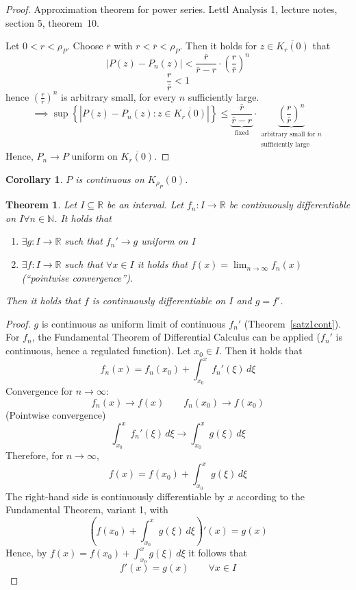 \documentclass{article}
\newtheorem{theorem}{Theorem}  \numberwithin{theorem}{section}
\newtheorem*{corollary}{Corollary}%
\newcommand{\set}[1]{\left\{#1\right\}}
\newcommand{\card}[1]{\left|#1\right|}
\begin{document}
\begin{proof}
  Approximation theorem for power series.
  Lettl Analysis 1, lecture notes, section 5, theorem~10.

  Let $0 < r < \rho_P$. Choose $\overline{r}$ with $r < \overline{r} < \rho_P$.
  Then it holds for $z \in \overline{K_r(0)}$ that
  \[ \card{P(z) - P_n(z)} < \frac{\overline{r}}{\overline{r} - r} \cdot \left(\frac{r}{\overline{r}}\right)^n \]
  \[ \frac{r}{\overline{r}} < 1 \]
  hence $\left(\frac{r}{\overline{r}}\right)^n$ is arbitrary small, for every $n$ sufficiently large.
  \[ \implies \sup\set{\card{P(z) - P_n(z): z \in \overline{K_r(0)}}} \leq \underbrace{\frac{\overline r}{\overline r - r}}_{\text{fixed}} \cdot \underbrace{\left(\frac{r}{\overline{r}}\right)^n}_{\substack{\text{arbitrary small for $n$} \\ \text{sufficiently large}}} \]
  Hence, $P_n \to P$ uniform on $\overline{K_r(0)}$.
\end{proof}

\begin{corollary}
  $P$ is continuous on $K_{\rho_P}(0)$.
\end{corollary}

\begin{theorem}
  Let $I \subseteq \mathbb R$ be an interval.
  Let $f_n: I \to \mathbb R$ be continuously differentiable on $I \forall n \in \mathbb N$.
  It holds that
  \begin{enumerate}
    \item $\exists g: I \to \mathbb R$ such that $f_n' \to g$ uniform on $I$
    \item $\exists f: I \to \mathbb R$ such that $\forall x \in I$ it holds that $f(x) = \lim_{n\to\infty} f_n(x)$ (\enquote{pointwise convergence}).
  \end{enumerate}
  Then it holds that $f$ is continuously differentiable on $I$ and $g = f'$.
\end{theorem}

\begin{proof}
  $g$ is continuous as uniform limit of continuous $f_n'$ (Theorem~\ref{satz1cont}).
  For $f_n$, the Fundamental Theorem of Differential Calculus can be applied ($f_n'$ is continuous, hence a regulated function).
  Let $x_0 \in I$. Then it holds that
  \[ f_n(x) = f_n(x_0) + \int_{x_0}^x f_n'(\xi) \, d\xi \]
  Convergence for $n \to \infty$:
  \[ f_n(x) \to f(x) \qquad f_n(x_0) \to f(x_0) \]
  (Pointwise convergence)
  \[ \int_{x_0}^x f_n'(\xi) \, d\xi \to \int_{x_0}^x g(\xi) \, d\xi \]
  Therefore, for $n \to \infty$,
  \[ f(x) = f(x_0) + \int^x_{x_0} g(\xi) \, d\xi \]
  The right-hand side is continuously differentiable by $x$ according to the Fundamental Theorem, variant 1,
  with
  \[ \left(f(x_0) + \int_{x_0}^x g(\xi) \, d\xi\right)'(x) = g(x) \]
  Hence, by $f(x) = f(x_0) + \int^x_{x_0} g(\xi) \, d\xi$ it follows that
  \[ f'(x) = g(x) \qquad \forall x \in I \]
\end{proof}
\end{document}
